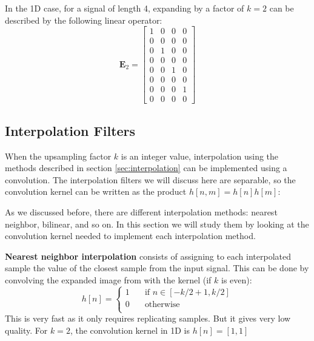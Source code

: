 In the 1D case, for a signal of length 4, expanding by a factor of $k=2$ can be described by the following linear operator:
\begin{equation}
	\mathbf{E}_2 = \left[
		\begin{array}{cccc}
			1 & 0 & 0 & 0 \\
			0 & 0 & 0 & 0 \\
			0 & 1 & 0 & 0 \\
			0 & 0 & 0 & 0 \\
			0 & 0 & 1 & 0 \\
			0 & 0 & 0 & 0 \\
			0 & 0 & 0 & 1 \\
			0 & 0 & 0 & 0
		\end{array}
		\right]
\end{equation}



\subsection{Interpolation Filters}

When the upsampling factor $k$ is an integer value, interpolation using the methods described in section \ref{sec:interpolation} can be implemented using a convolution.
The interpolation filters we will discuss here are separable, so the convolution kernel can be written as the product $h\left[n,m\right] = h\left[n\right] h\left[m\right]$:

As we discussed before, there are different interpolation methods: nearest neighbor, bilinear, and so on. In this section we will study them by looking at the convolution kernel needed to implement each interpolation method.

	{\bf Nearest neighbor interpolation} consists of assigning to each interpolated sample the value of the closest sample from the input signal. This can be done by convolving the expanded image from \eqn{\ref{eq:upzeros}} with the kernel (if $k$ is even):
\begin{equation}
	h  \left[n\right] =  \begin{cases}
		1 & \quad \text{if }  n \in  \left[-k/2+1, k/2\right] \\
		0 & \quad \text{otherwise }                           \\
	\end{cases}
\end{equation}
This is very fast as it only requires replicating samples. But it gives very low quality. For $k=2$, the convolution kernel in 1D is $h  \left[n\right]=[1, 1]$

